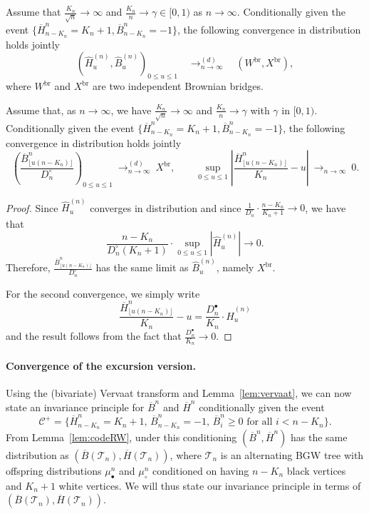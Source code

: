 \documentclass[AHL,XML,longabstracts,Unicode]{cedram}
\def\mubn{\mu_{\bullet}^{n}}
\def\mucn{\mu_{\circ}^{n}}
\def\Dbn{D^{\bullet}_{n}}
\def\Dcn{D^{\circ}_{n}}
\def\oB{\overline{B}}
\def\hB{\widehat{B}}
\def\oH{\overline{H}}
\def\hH{\widehat{H}}
\def \Xbr{X^{\mathrm{br}}}
\def\Ts{\mathscr{T}}
\begin{document}
\begin{lemma}Assume that $\frac{K_{n}}{\sqrt{n}} \rightarrow   \infty$ and   $\tfrac{K_{n}}{n}  \rightarrow \gamma \in [0,1)$ as $n \rightarrow \infty$. Conditionally given the event
$ \{\oH^{n}_{n-K_{n}}=K_{n}+1, \oB^{n}_{n-K_{n}}=-1 \}$, the following  convergence in distribution holds jointly
\[  \left(  \hH^{(n)}_{u},  \hB^{(n)}_{u} \right)_{0 \leq u \leq 1}  \quad \mathop{\longrightarrow}^{(d)}_{n \rightarrow \infty} \quad (W^{\mathrm{br}},\Xbr),\]
where $W^{\mathrm{br}}$ and $\Xbr$ are two independent Brownian bridges.
\end{lemma}


\begin{corollary}\label{cor:cvjointe}
Assume that, as $n\rightarrow \infty$, we have $\frac{K_{n}}{\sqrt{n}} \rightarrow   \infty$ and   $\tfrac{K_{n}}{n}  \rightarrow \gamma$
with $\gamma$ in $[0,1)$. Conditionally given the event
$ \{\oH^{n}_{n-K_{n}}=K_{n}+1, \oB^{n}_{n-K_{n}}=-1 \}$, the following  convergence in distribution holds jointly
\[\left(  \frac{\oB^{n}_{ \lfloor u (n-K_{n}) \rfloor }}{\Dcn} \right)_{0 \leq u \leq 1}  \ \mathop{\longrightarrow}^{(d)}_{n \rightarrow \infty} \  \Xbr,  \qquad  \sup_{0 \leq u \leq 1} \left|   \frac{\oH^{n}_{ \lfloor u (n-K_{n}) \rfloor }}{K_{n}}-u\right|  \ \mathop{\longrightarrow}_{n \rightarrow \infty} \ 0.\]
\end{corollary}


\begin{proof}
  Since $  \hH^{(n)}_{u}$
  converges in distribution and since $ \frac{1}{\Dcn} \cdot \frac{n-K_{n}}{K_{n}+1} \rightarrow 0$, we have that
\[  \frac{n-K_{n}}{\Dcn(K_{n}+1)} \cdot \sup_{0 \leq u \leq 1}| \hH^{(n)}_{u}| \rightarrow 0.\]
Therefore, $\frac{\oB^{n}_{ \lfloor u (n-K_{n}) \rfloor }}{\Dcn}$
has the same limit as $\hB^{(n)}_{u}$, namely $\Xbr$.

For the second convergence, we simply write
\[\frac{\oH^{n}_{ \lfloor u (n-K_{n}) \rfloor }}{K_{n}}-u= \frac{\Dbn}{K_{n}} \cdot \hH^{(n)}_{u}\]
and the result follows from the fact that $ \frac{\Dbn}{K_{n}} \rightarrow 0$.
\end{proof}


\paragraph*{Convergence of the excursion version.}

Using the (bivariate) Vervaat transform and Lemma~\ref{lem:vervaat},
we can now state an invariance principle for $\oB^{n}$ and $\oH^{n}$
conditionally given the event
\[\mathcal C^+=\{\oH^{n}_{n-K_{n}}=K_{n}+1,\, \oB^{n}_{n-K_{n}}=-1,\, \oB^{n}_i \ge 0\text{ for all }i <n-K_n \}.\]
From Lemma~\ref{lem:codeRW},
under this conditioning $(\oB^{n}, \oH^{n})$ has the same distribution
as $(\oB(\Ts_n),\oH(\Ts_n))$,
where $\Ts_n$ is an alternating BGW tree with offspring distributions $\mubn$ and $\mucn$
conditioned on having $n-K_n$ black vertices and $K_n+1$ white vertices.
We will thus state our invariance principle in terms of $(\oB(\Ts_n),\oH(\Ts_n))$.
\end{document}
